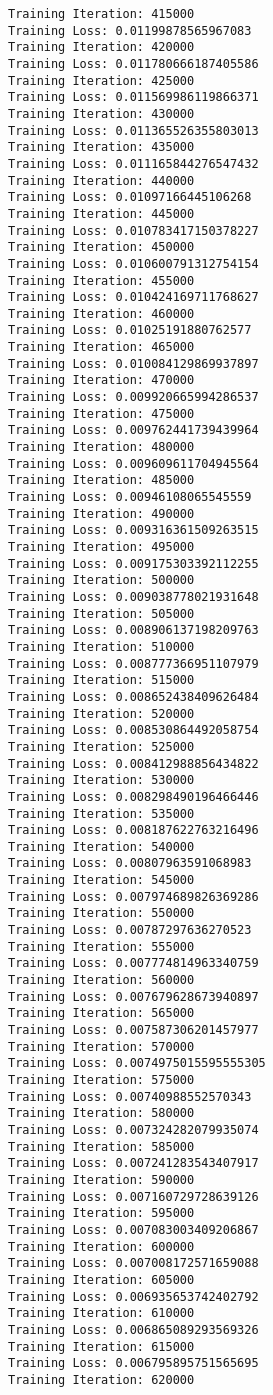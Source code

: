 \documentclass[11pt]{article}
\begin{document}
\begin{Verbatim}[commandchars=\\\{\}]
Training Iteration: 415000
Training Loss: 0.01199878565967083
Training Iteration: 420000
Training Loss: 0.011780666187405586
Training Iteration: 425000
Training Loss: 0.011569986119866371
Training Iteration: 430000
Training Loss: 0.011365526355803013
Training Iteration: 435000
Training Loss: 0.011165844276547432
Training Iteration: 440000
Training Loss: 0.01097166445106268
Training Iteration: 445000
Training Loss: 0.010783417150378227
Training Iteration: 450000
Training Loss: 0.010600791312754154
Training Iteration: 455000
Training Loss: 0.010424169711768627
Training Iteration: 460000
Training Loss: 0.01025191880762577
Training Iteration: 465000
Training Loss: 0.010084129869937897
Training Iteration: 470000
Training Loss: 0.009920665994286537
Training Iteration: 475000
Training Loss: 0.009762441739439964
Training Iteration: 480000
Training Loss: 0.009609611704945564
Training Iteration: 485000
Training Loss: 0.00946108065545559
Training Iteration: 490000
Training Loss: 0.009316361509263515
Training Iteration: 495000
Training Loss: 0.009175303392112255
Training Iteration: 500000
Training Loss: 0.009038778021931648
Training Iteration: 505000
Training Loss: 0.008906137198209763
Training Iteration: 510000
Training Loss: 0.008777366951107979
Training Iteration: 515000
Training Loss: 0.008652438409626484
Training Iteration: 520000
Training Loss: 0.008530864492058754
Training Iteration: 525000
Training Loss: 0.008412988856434822
Training Iteration: 530000
Training Loss: 0.008298490196466446
Training Iteration: 535000
Training Loss: 0.008187622763216496
Training Iteration: 540000
Training Loss: 0.00807963591068983
Training Iteration: 545000
Training Loss: 0.007974689826369286
Training Iteration: 550000
Training Loss: 0.00787297636270523
Training Iteration: 555000
Training Loss: 0.007774814963340759
Training Iteration: 560000
Training Loss: 0.007679628673940897
Training Iteration: 565000
Training Loss: 0.007587306201457977
Training Iteration: 570000
Training Loss: 0.0074975015595555305
Training Iteration: 575000
Training Loss: 0.00740988552570343
Training Iteration: 580000
Training Loss: 0.007324282079935074
Training Iteration: 585000
Training Loss: 0.007241283543407917
Training Iteration: 590000
Training Loss: 0.007160729728639126
Training Iteration: 595000
Training Loss: 0.007083003409206867
Training Iteration: 600000
Training Loss: 0.007008172571659088
Training Iteration: 605000
Training Loss: 0.006935653742402792
Training Iteration: 610000
Training Loss: 0.006865089293569326
Training Iteration: 615000
Training Loss: 0.006795895751565695
Training Iteration: 620000

\end{Verbatim}
\end{document}
